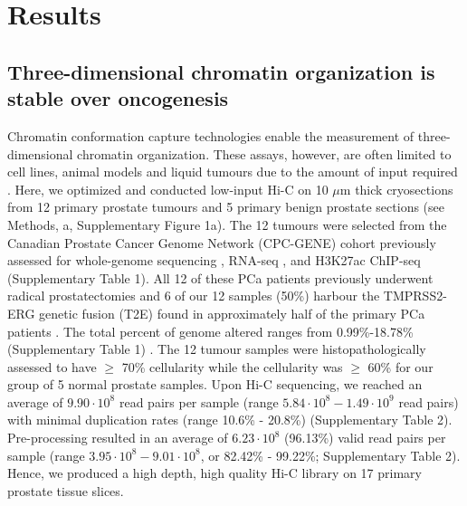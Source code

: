 \section{Results}

\subsection{Three-dimensional chromatin organization is stable over oncogenesis}

Chromatin conformation capture technologies enable the measurement of three-dimensional chromatin organization.
These assays, however, are often limited to cell lines, animal models and liquid tumours due to the amount of input required \cite{lieberman-aidenComprehensiveMappingLongRange2009}.
Here, we optimized and conducted low-input Hi-C \cite{diazChromatinConformationAnalysis2018} on 10 $\mu$m thick cryosections from 12 primary prostate tumours and 5 primary benign prostate sections (see Methods, a, Supplementary Figure 1a).
The 12 tumours were selected from the Canadian Prostate Cancer Genome Network (CPC-GENE) cohort previously assessed for whole-genome sequencing \cite{fraserGenomicHallmarksLocalized2017}, RNA-seq \cite{chenWidespreadFunctionalRNA2019}, and H3K27ac ChIP-seq \cite{kronTMPRSS2ERGFusion2017,mazrooeiCistromePartitioningReveals2019} (Supplementary Table 1).
All 12 of these PCa patients previously underwent radical prostatectomies and 6 of our 12 samples (50\%) harbour the TMPRSS2-ERG genetic fusion (T2E) found in approximately half of the primary PCa patients \cite{fraserGenomicHallmarksLocalized2017}.
The total percent of genome altered ranges from 0.99\%-18.78\% (Supplementary Table 1) \cite{fraserGenomicHallmarksLocalized2017}.
The 12 tumour samples were histopathologically assessed to have $\ge$ 70\% cellularity while the cellularity was $\ge$ 60\% for our group of 5 normal prostate samples.
Upon Hi-C sequencing, we reached an average of $9.90 \cdot 10^8$  read pairs per sample (range $5.84 \cdot 10^8 - 1.49 \cdot 10^9$ read pairs) with minimal duplication rates (range 10.6\% - 20.8\%) (Supplementary Table 2).
Pre-processing resulted in an average of $6.23 \cdot 10^8$ (96.13\%) valid read pairs per sample (range $3.95 \cdot 10^8 - 9.01 \cdot 10^8$, or 82.42\% - 99.22\%; Supplementary Table 2).
Hence, we produced a high depth, high quality Hi-C library on 17 primary prostate tissue slices.


